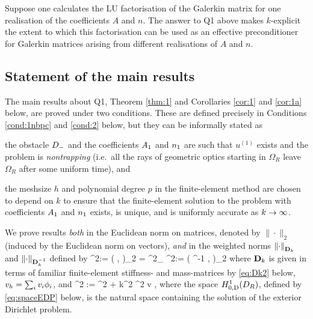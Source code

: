 
Suppose one calculates the LU factorisation of the Galerkin matrix for one realisation of the coefficients $A$ and $n$. The answer to Q1 above makes $k$-explicit the extent to which this factorisation can be used as an effective preconditioner for Galerkin matrices arising from different realisations of $A$ and $n$.

\subsection{Statement of the main results}\label{sec:main}
The main results about Q1, Theorem \ref{thm:1} and Corollaries \ref{cor:1} and \ref{cor:1a} below, are proved under two conditions. These are defined precisely in Conditions \ref{cond:1nbpc} and \ref{cond:2} below, but they can be informally stated as 
\bit
\item the obstacle $D_{-}$ and the coefficients $A_{1}$ and $n_{1}$ are such that $u^{(1)}$ exists and the problem is \emph{nontrapping} (i.e.~all the rays of geometric optics starting in $\Omega_R$ leave $\Omega_R$ after some uniform time), and
\item the meshsize $h$ and polynomial degree $p$ in the finite-element method are chosen to depend on $k$ to ensure that the 
finite-element solution to the problem with coefficients $A_{1}$ and $n_{1}$ exists, is unique, and 
is uniformly accurate as $k\rightarrow \infty$. 
\eit 

We prove results \emph{both} in the Euclidean norm on matrices, denoted by $\|\cdot\|_2$ (induced by the Euclidean norm on vectors), \emph{and} in the weighted norms $\NDmatk{\cdot}$ and $\NDmatkI{\cdot}$ defined by 
\beq\label{eq:Dk}
\NDmatk{\bv}^2:= \big( \Dmatk \bv, \bv\big)_2 = %
^2_{\HokDR}
\quad \tand
\quad \NDmatkI{\bv}^2:= \big( \Dmatk^{-1} \bv, \bv\big)_2 %
\eeq
where $\mathbf{D}_{k}$ is given in terms of familiar finite-element stiffness- and mass-matrices by \eqref{eq:Dk2} below, 
$v_{h} =\sum_i v_{i} \phi_{i}$, and 
\beq\label{eq:1knorm}
^2 := ^2 + k^2 ^2 \quad \tfor v \in \HozDDR,
\eeq
where the space $\HozDDR$, defined by \eqref{eq:spaceEDP} below, is the natural space containing the solution of the exterior Dirichlet problem. 

